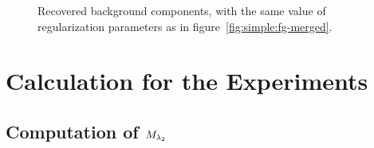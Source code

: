     \begin{figure}[p]
        \caption{Recovered background components, with the same value of regularization parameters as in figure~\ref{fig:simple:fg-merged}.}
        \label{fig:simple:bg}        
    \end{figure}


\clearpage
\section{Calculation for the Experiments}
    \label{app:calculation}

    \subsection{Computation of \texorpdfstring{$M_{\lambda_{2}}$}{M lambda 2}}

